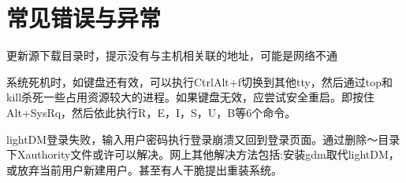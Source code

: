 \section{常见错误与异常}
更新源下载目录时，提示没有与主机相关联的地址，可能是网络不通

系统死机时，如键盘还有效，可以执行CtrlAlt+f切换到其他tty，然后通过top和kill杀死一些占用资源较大的进程。如果键盘无效，应尝试安全重启。即按住Alt+SysRq，然后依此执行R，E，I，S，U，B等6个命令。

lightDM登录失败，输入用户密码执行登录崩溃又回到登录页面。通过删除～目录下Xauthority文件或许可以解决。网上其他解决方法包括:安装gdm取代lightDM，或放弃当前用户新建用户。甚至有人干脆提出重装系统。
